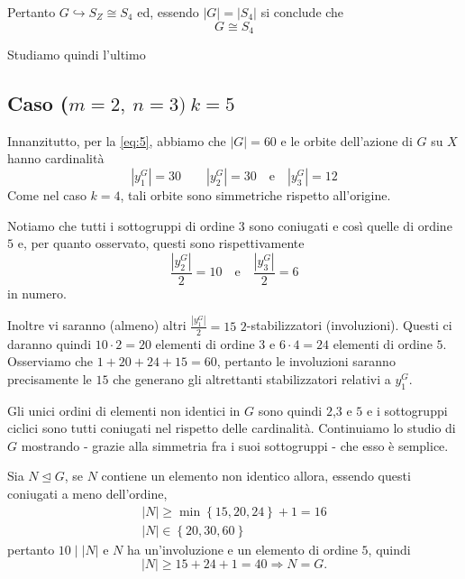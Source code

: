 Pertanto $G\hookrightarrow S_Z\cong S_4$ ed, essendo $\left|G\right|=\left|S_4\right|$ si conclude che
\begin{equation*}
G\cong S_4
\end{equation*}

Studiamo quindi l'ultimo
\subsection{Caso ($m=2,\ n=3)\ k=5$}
Innanzitutto, per la \ref{eq:5}, abbiamo che $\left|G\right|=60$ e le orbite dell'azione di $G$ su $X$ hanno cardinalit\`a
\begin{equation*}
\left|y_1^G\right|=30\qquad\left|y_2^G\right|=30\quad\text{e}\quad\left|y_3^G\right|=12
\end{equation*}
Come nel caso $k=4$, tali orbite sono simmetriche rispetto all'origine.

Notiamo che tutti i sottogruppi di ordine $3$ sono coniugati e cos\`i quelle di ordine $5$ e, per quanto osservato, questi sono
rispettivamente
\begin{equation*}
\frac{\left|y_2^G\right|}{2}=10\quad\text{e}\quad\frac{\left|y_3^G\right|}{2}=6
\end{equation*}
in numero.

Inoltre vi saranno (almeno) altri $\frac{\left|y_1^G\right|}{2}=15$ $2$-stabilizzatori (involuzioni). Questi ci daranno quindi
$10\cdot 2=20$ elementi di ordine $3$ e $6\cdot 4=24$ elementi di ordine $5$. Osserviamo che $1+20+24+15=60$, pertanto le involuzioni
saranno precisamente le $15$ che generano gli altrettanti stabilizzatori relativi a $y_1^G$.

Gli unici ordini di elementi non identici in $G$ sono quindi $2$,$3$ e $5$ e i sottogruppi ciclici sono tutti coniugati nel rispetto
delle cardinalit\`a. Continuiamo lo studio di $G$ mostrando - grazie alla simmetria fra i suoi sottogruppi - che esso \`e semplice.

Sia $N\trianglelefteq G$, se $N$ contiene un elemento non identico allora, essendo questi coniugati a meno dell'ordine,
\begin{gather*}
\left|N\right|\geq\min{\left\{15,20,24\right\}}+1=16\\
\left|N\right|\in\left\{20,30,60\right\}
\end{gather*}
pertanto $10\mid\left|N\right|$ e $N$ ha un'involuzione e un elemento di ordine $5$, quindi
\begin{equation*}
\left|N\right|\geq 15+24+1=40\Rightarrow N=G.
\end{equation*}

